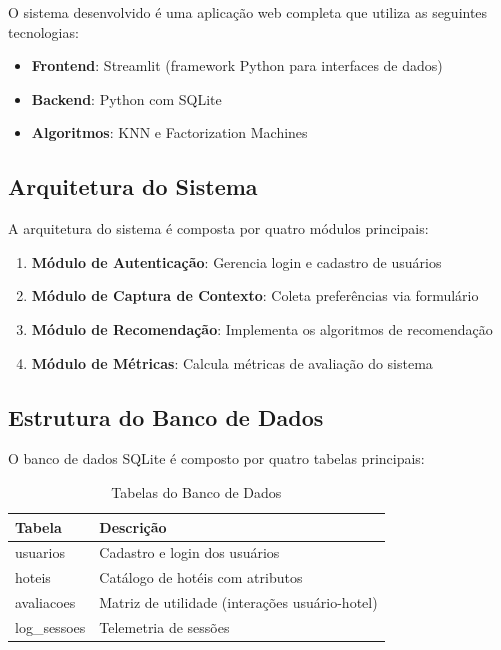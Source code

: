 \documentclass[10pt,twocolumn,letterpaper]{article}
\begin{document}
O sistema desenvolvido é uma aplicação web completa que utiliza as seguintes tecnologias:
\begin{itemize}
    \item \textbf{Frontend}: Streamlit (framework Python para interfaces de dados)
    \item \textbf{Backend}: Python com SQLite
    \item \textbf{Algoritmos}: KNN e Factorization Machines
\end{itemize}

\subsection{Arquitetura do Sistema}

A arquitetura do sistema é composta por quatro módulos principais:

\begin{enumerate}
    \item \textbf{Módulo de Autenticação}: Gerencia login e cadastro de usuários
    \item \textbf{Módulo de Captura de Contexto}: Coleta preferências via formulário
    \item \textbf{Módulo de Recomendação}: Implementa os algoritmos de recomendação
    \item \textbf{Módulo de Métricas}: Calcula métricas de avaliação do sistema
\end{enumerate}

\subsection{Estrutura do Banco de Dados}

O banco de dados SQLite é composto por quatro tabelas principais:

\begin{table}[h]
\centering
\caption{Tabelas do Banco de Dados}
\label{tab:tables}
\begin{tabular}{@{}ll@{}}
\toprule
\textbf{Tabela} & \textbf{Descrição} \\
\midrule
usuarios & Cadastro e login dos usuários \\
hoteis & Catálogo de hotéis com atributos \\
avaliacoes & Matriz de utilidade (interações usuário-hotel) \\
log\_sessoes & Telemetria de sessões \\
\bottomrule
\end{tabular}
\end{table}
\end{document}
